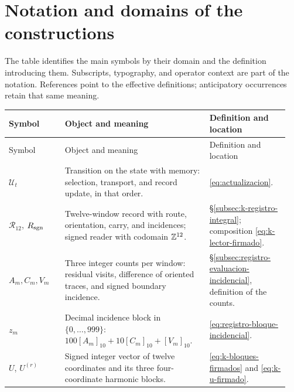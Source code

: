 \section*{Notation and domains of the constructions}
\label{sec:ii-notacion}

The table identifies the main symbols by their domain and the
definition introducing them. Subscripts, typography, and operator
context are part of the notation. References point to the
effective definitions; anticipatory occurrences retain that
same meaning.

\begingroup
\small
\setlength{\tabcolsep}{4pt}
\renewcommand{\arraystretch}{1.12}
\begin{longtable}{@{}>{\raggedright\arraybackslash}p{0.19\linewidth}
                    >{\raggedright\arraybackslash}p{0.49\linewidth}
                    >{\raggedright\arraybackslash}p{0.27\linewidth}@{}}
\toprule
Symbol & Object and meaning & Definition and location\\
\midrule
\endfirsthead
\toprule
Symbol & Object and meaning & Definition and location\\
\midrule
\endhead
\bottomrule
\endfoot

\(\mathcal U_t\)
& Transition on the state with memory: selection, transport, and
  record update, in that order.
& \eqref{eq:actualizacion}.\\[3pt]

\(\mathcal R_{12}\), \(R_{\rm sgn}\)
& Twelve-window record with route, orientation, carry, and incidences;
  signed reader with codomain \(\mathbb Z^{12}\).
& \S\ref{subsec:k-registro-integral};
  composition \eqref{eq:k-lector-firmado}.\\[3pt]

\(A_m,C_m,V_m\)
& Three integer counts per window: residual visits, difference of
  oriented traces, and signed boundary incidence.
& \S\ref{subsec:registro-evaluacion-incidencial},
  definition of the counts.\\[3pt]

\(z_m\)
& Decimal incidence block in \(\{0,\ldots,999\}\):
  \(100[A_m]_{10}+10[C_m]_{10}+[V_m]_{10}\).
& \eqref{eq:registro-bloque-incidencial}.\\[3pt]

\(U\), \(U^{(r)}\)
& Signed integer vector of twelve coordinates and its three
  four-coordinate harmonic blocks.
& \eqref{eq:k-bloques-firmados} and
  \eqref{eq:k-u-firmado}.\\[3pt]


\end{longtable}

